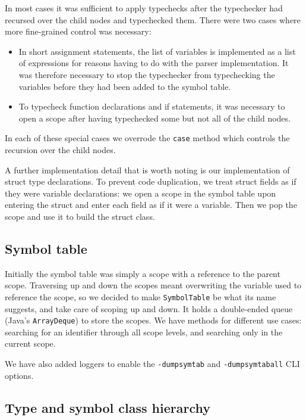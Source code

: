 \documentclass[oneside]{article}
\begin{document}
In most cases it was sufficient to apply typechecks after the typechecker had recursed over the child nodes and typechecked them. There were two cases where more fine-grained control was necessary:

\begin{itemize}
    \item In short assignment statements, the list of variables is implemented as a list of expressions for reasons having to do with the parser implementation. It was therefore necessary to stop the typechecker from typechecking the variables before they had been added to the symbol table.
    \item To typecheck function declarations and if statements, it was necessary to open a scope after having typechecked some but not all of the child nodes.
\end{itemize}

In each of these special cases we overrode the \verb|case| method which controls the recursion over the child nodes.

A further implementation detail that is worth noting is our implementation of struct type declarations. To prevent code duplication, we treat struct fields as if they were variable declarations: we open a scope in the symbol table upon entering the struct and enter each field as if it were a variable. Then we pop the scope and use it to build the struct class.

\subsection{Symbol table}

Initially the symbol table was simply a scope with a reference to the parent scope. Traversing up and down the scopes meant overwriting the variable used to reference the scope, so we decided to make \texttt{SymbolTable} be what its name suggests, and take care of scoping up and down. It holds a double-ended queue (Java's \texttt{ArrayDeque}) to store the scopes. We have methods for different use cases: searching for an identifier through all scope levels, and searching only in the current scope.

We have also added loggers to enable the \verb|-dumpsymtab| and \verb|-dumpsymtaball| CLI options.

\subsection{Type and symbol class hierarchy}
\end{document}
